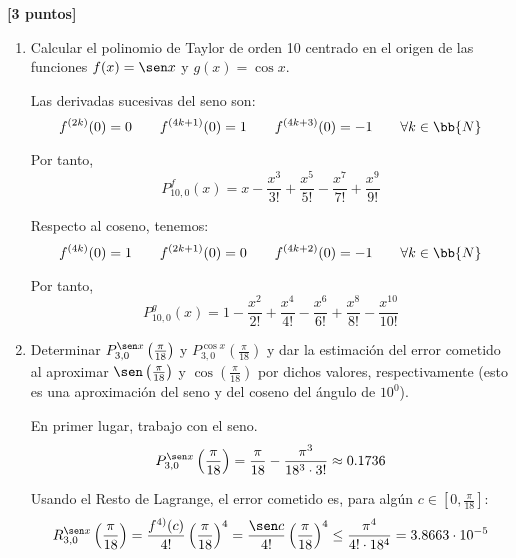 \documentclass[12pt]{article}
\begin{document}
\begin{ejercicio} \textbf{[3 puntos]}
    \begin{enumerate}
        \item Calcular el polinomio de Taylor de orden 10 centrado en el origen de las funciones $f(x)=\sen x$ y $g(x)=\cos x$.

        Las derivadas sucesivas del seno son:
        \begin{equation*}
            f^{(2k)}(0) = 0 \qquad f^{(4k+1)}(0) = 1 \qquad f^{(4k+3)}(0) = -1 \qquad \forall k\in \bb{N}
        \end{equation*}

        Por tanto,
        \begin{equation*}
            P_{10,0}^f(x) = x - \frac{x^3}{3!} + \frac{x^5}{5!} - \frac{x^7}{7!} + \frac{x^9}{9!}
        \end{equation*}

        Respecto al coseno, tenemos:
        \begin{equation*}
            f^{(4k)}(0) = 1 \qquad f^{(2k+1)}(0) = 0 \qquad f^{(4k+2)}(0) = -1 \qquad \forall k\in \bb{N}
        \end{equation*}

        Por tanto,
        \begin{equation*}
            P_{10,0}^g(x) = 1 - \frac{x^2}{2!} + \frac{x^4}{4!} - \frac{x^6}{6!} + \frac{x^8}{8!} - \frac{x^{10}}{10!}
        \end{equation*}

        \item Determinar $P_{3,0}^{\sen x} \left(\frac{\pi}{18}\right)$ y $P_{3,0}^{\cos x} \left(\frac{\pi}{18}\right)$ y dar la estimación del error cometido al aproximar $\sen \left(\frac{\pi}{18}\right)$ y $\cos \left(\frac{\pi}{18}\right)$ por dichos valores, respectivamente (esto es una aproximación del seno y del coseno del ángulo de $10^0$).

        En primer lugar, trabajo con el seno.
        \begin{equation*}
            P_{3,0}^{\sen x} \left(\frac{\pi}{18}\right) = \frac{\pi}{18} -\frac{\pi^3}{18^3\cdot 3!} \approx 0.1736
        \end{equation*}
        
        Usando el Resto de Lagrange, el error cometido es, para algún $c\in \left[0, \frac{\pi}{18}\right]$:
        \begin{equation*}
            R_{3,0}^{\sen x} \left(\frac{\pi}{18}\right) = \frac{f^{4)}(c)}{4!} \left(\frac{\pi}{18}\right)^4 = \frac{\sen c}{4!}  \left(\frac{\pi}{18}\right)^4 \leq \frac{\pi^4}{4! \cdot 18^4} = 3.8663\cdot 10^{-5}
        \end{equation*}



\end{enumerate}
\end{ejercicio}
\end{document}
